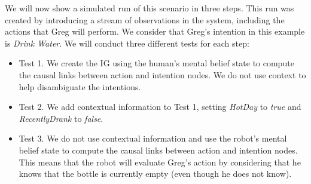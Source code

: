 We will now show a simulated run of this scenario in three steps. This run was created by introducing a stream of observations in the system, including the actions that Greg will perform. We consider that Greg's intention in this example is \textit{Drink Water}. We will conduct three different tests for each step:
\begin{itemize}
	\item Test 1. We create the IG using the human's mental belief state to compute the causal links between action and intention nodes. We do not use context to help disambiguate the intentions.
	\item Test 2. We add contextual information to Test 1, setting \textit{HotDay} to \textit{true} and \textit{RecentlyDrank} to \textit{false}.
	\item Test 3. We do not use contextual information and use the robot's mental belief state to compute the causal links between action and intention nodes. This means that the robot will evaluate Greg's action by considering that he knows that the bottle is currently empty (even though he does not know).
\end{itemize}

